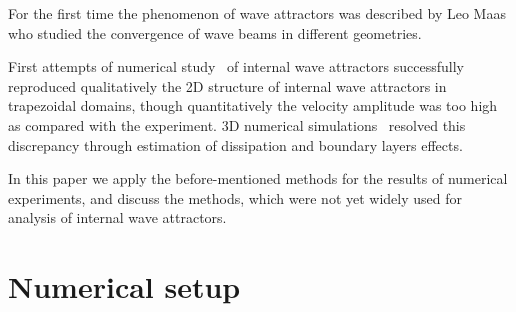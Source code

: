 \documentclass[a4wide,fontsize=12pt]{article}
\begin{document}

For the first time the phenomenon of wave attractors was described by Leo Maas \cite{Maas1995,1997MaasBenielliSommeriaLam} who studied the convergence of wave beams in different geometries.

First attempts of numerical study~\cite{2008GrisouardStaquetPairaud} of internal wave attractors successfully reproduced qualitatively the 2D structure of internal wave attractors in trapezoidal domains, though quantitatively the velocity amplitude was too high  as compared with the experiment. 3D numerical simulations~\cite{2016BrouzetSibgatullinScolanErmanyukDauxois,2016BrouzetErmanyukJoubaudSibgatullinDauxois} resolved this discrepancy through estimation of dissipation and boundary layers effects.

In this paper we apply the before-mentioned methods for the results of numerical experiments, and discuss the methods, which were not yet widely used for analysis of internal wave attractors.

\section{Numerical setup}
\end{document}
